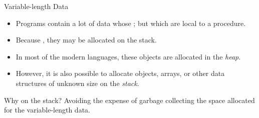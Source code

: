 \begin{bibunit}[apalike]
\begin{frame}{Variable-length Data}
	\begin{itemize}
	\item Programs contain a lot of data whose ; but which are local to a procedure.
	\item Because , they may be allocated on the stack.
	\vfill
	\item In most of the modern languages, these objects are allocated in the \emph{heap}.
	\item However, it is also possible to allocate objects, arrays, or other data structures of unknown size on the \emph{stack}.
	\end{itemize}
	\vfill
	\begin{block}{Why on the stack?}
		Avoiding the expense of garbage collecting the space allocated for the variable-length data.
	\end{block}
\end{frame}



\end{bibunit}
